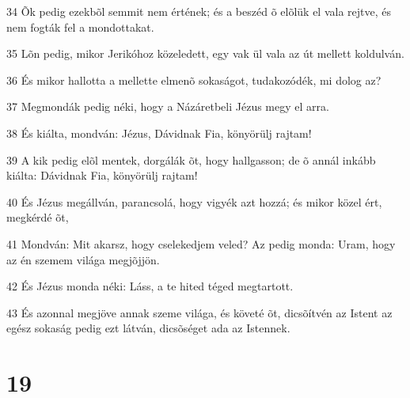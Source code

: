 \par 34 Õk pedig ezekbõl semmit nem értének; és a beszéd õ elõlük el vala rejtve, és nem fogták fel a mondottakat.
\par 35 Lõn pedig, mikor Jerikóhoz közeledett, egy vak ül vala az út mellett koldulván.
\par 36 És mikor hallotta a mellette elmenõ sokaságot, tudakozódék, mi dolog az?
\par 37 Megmondák pedig néki, hogy a Názáretbeli Jézus megy el arra.
\par 38 És kiálta, mondván: Jézus, Dávidnak Fia, könyörülj rajtam!
\par 39 A kik pedig elõl mentek, dorgálák õt, hogy hallgasson; de õ annál inkább kiálta: Dávidnak Fia, könyörülj rajtam!
\par 40 És Jézus megállván, parancsolá, hogy vigyék azt hozzá; és mikor közel ért, megkérdé õt,
\par 41 Mondván: Mit akarsz, hogy cselekedjem veled? Az pedig monda: Uram, hogy az én szemem világa megjõjjön.
\par 42 És Jézus monda néki: Láss, a te hited téged megtartott.
\par 43 És azonnal megjöve annak szeme világa, és követé õt, dicsõítvén az Istent az egész sokaság pedig ezt látván, dicsõséget ada az Istennek.

\chapter{19}

